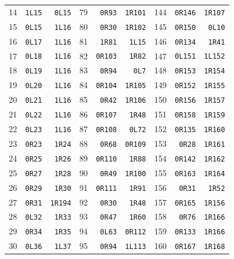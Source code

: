{\begin{longtable}{@{}rrr@{\hspace{18pt}}rrr@{\hspace{18pt}}rrr@{}}
14 & \texttt{1L15} & \texttt{0L15} & 79 & \texttt{0R93} & \texttt{1R101} & 144 & \texttt{0R146} & \texttt{1R107}\\
15 & \texttt{0L15} & \texttt{1L16} & 80 & \texttt{0R30} & \texttt{1R102} & 145 & \texttt{0R150} & \texttt{0L10}\\
16 & \texttt{0L17} & \texttt{1L16} & 81 & \texttt{1R81} & \texttt{1L15} & 146 & \texttt{0R134} & \texttt{1R41}\\
17 & \texttt{0L18} & \texttt{1L16} & 82 & \texttt{0R103} & \texttt{1R82} & 147 & \texttt{0L151} & \texttt{1L152}\\
18 & \texttt{0L19} & \texttt{1L16} & 83 & \texttt{0R94} & \texttt{0L7} & 148 & \texttt{0R153} & \texttt{1R154}\\
19 & \texttt{0L20} & \texttt{1L16} & 84 & \texttt{0R104} & \texttt{1R105} & 149 & \texttt{0R152} & \texttt{1R155}\\
20 & \texttt{0L21} & \texttt{1L16} & 85 & \texttt{0R42} & \texttt{1R106} & 150 & \texttt{0R156} & \texttt{1R157}\\
21 & \texttt{0L22} & \texttt{1L16} & 86 & \texttt{0R107} & \texttt{1R48} & 151 & \texttt{0R158} & \texttt{1R159}\\
22 & \texttt{0L23} & \texttt{1L16} & 87 & \texttt{0R108} & \texttt{0L72} & 152 & \texttt{0R135} & \texttt{1R160}\\
23 & \texttt{0R23} & \texttt{1R24} & 88 & \texttt{0R68} & \texttt{0R109} & 153 & \texttt{0R28} & \texttt{1R161}\\
24 & \texttt{0R25} & \texttt{1R26} & 89 & \texttt{0R110} & \texttt{1R88} & 154 & \texttt{0R142} & \texttt{1R162}\\
25 & \texttt{0R27} & \texttt{1R28} & 90 & \texttt{0R49} & \texttt{1R100} & 155 & \texttt{0R163} & \texttt{1R164}\\
26 & \texttt{0R29} & \texttt{1R30} & 91 & \texttt{0R111} & \texttt{1R91} & 156 & \texttt{0R31} & \texttt{1R52}\\
27 & \texttt{0R31} & \texttt{1R194} & 92 & \texttt{0R30} & \texttt{1R48} & 157 & \texttt{0R165} & \texttt{1R156}\\
28 & \texttt{0L32} & \texttt{1R33} & 93 & \texttt{0R47} & \texttt{1R60} & 158 & \texttt{0R76} & \texttt{1R166}\\
29 & \texttt{0R34} & \texttt{1R35} & 94 & \texttt{0L63} & \texttt{0R112} & 159 & \texttt{0R133} & \texttt{1R166}\\
30 & \texttt{0L36} & \texttt{1L37} & 95 & \texttt{0R94} & \texttt{1L113} & 160 & \texttt{0R167} & \texttt{1R168}\\

\end{longtable}}
